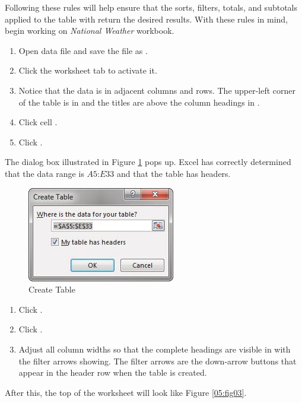 Following these rules will help ensure that the sorts, filters, totals, and subtotals applied to the table with return the desired results. With these rules in mind, begin working on \textit{National Weather} workbook. 

\begin{enumerate}
	\item Open data file  and save the file as .
	\item Click the  worksheet tab to activate it.
	\item Notice that the data is in adjacent columns and rows. The upper-left corner of the table is in  and the titles are above the column headings in .
	\item Click cell .
	\item Click .
\end{enumerate}

The dialog box illustrated in Figure \ref{05:fig02} pops up. Excel has correctly determined that the data range is $ A5 $:$ E33 $ and that the table has headers.

\begin{figure}[H]
	\centering
	\includegraphics[width=\maxwidth{.95\linewidth}]{gfx/ch05_fig02}
	\caption{Create Table}
	\label{05:fig02}
\end{figure}

\begin{enumerate}[resume]
	\item Click .
	\item Click .
	\item Adjust all column widths so that the complete headings are visible in  with the filter arrows showing. The filter arrows are the down-arrow buttons that appear in the header row when the table is created. 
\end{enumerate}

After this, the top of the worksheet will look like Figure \ref{05:fig03}.

